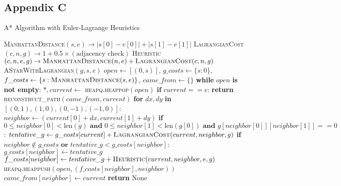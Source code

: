 \documentclass[12pt]{article}
\begin{document}
\subsection*{Appendix C}
\begin{algorithm}
\caption{A* Algorithm with Euler-Lagrange Heuristics}
\begin{algorithmic}[1]
 \textsc{ManhattanDistance}$(s, e) \rightarrow |s[0] - e[0]| + |s[1] - e[1]|$
 \textsc{LagrangianCost}$(c, n, g) \rightarrow 1 + 0.5 \times (\text{adjacency check})$
 \textsc{Heuristic}$(c, n, e, g) \rightarrow \textsc{ManhattanDistance}(n, e) + \textsc{LagrangianCost}(c, n, g)$
 \textsc{AStarWithLagrangian}$(g, s, e)$
\STATE \quad $open \gets [(0, s)]$, $g\_costs \gets \{s: 0\}$, $f\_costs \gets \{s: \textsc{ManhattanDistance}(s, e)\}$, $came\_from \gets \{\}$
\STATE \quad \textbf{while} $open$ \textbf{is not empty}:
\STATE \quad \quad $*, current \gets$ \textsc{heapq.heappop}$(open)$
\STATE \quad \quad \textbf{if} $current == e$: \textbf{return} \textsc{reconstruct\_path}$(came\_from, current)$
\STATE \quad \quad \textbf{for} $dx, dy$ \textbf{in} $[(0,1),(1,0),(0,-1),(-1,0)]$:
\STATE \quad \quad \quad $neighbor \gets (current[0]+dx, current[1]+dy)$
\STATE \quad \quad \quad \textbf{if} $0 \le neighbor[0] < \text{len}(g) \textbf{ and } 0 \le neighbor[1] < \text{len}(g[0]) \textbf{ and } g[neighbor[0]][neighbor[1]] == 0$:
\STATE \quad \quad \quad \quad $tentative\_g \gets g\_costs[current] + \textsc{LagrangianCost}(current, neighbor, g)$
\STATE \quad \quad \quad \quad \textbf{if} $neighbor \notin g\_costs \textbf{ or } tentative\_g < g\_costs[neighbor]$:
\STATE \quad \quad \quad \quad \quad $g\_costs[neighbor] \gets tentative\_g$
\STATE \quad \quad \quad \quad \quad $f\_costs[neighbor] \gets tentative\_g + \textsc{Heuristic}(current, neighbor, e, g)$
\STATE \quad \quad \quad \quad \quad \textsc{heapq.heappush}$(open, (f\_costs[neighbor], neighbor))$
\STATE \quad \quad \quad \quad \quad $came\_from[neighbor] \gets current$
\STATE \quad \textbf{return} None
\end{algorithmic}
\end{algorithm}

\newpage
\end{document}
